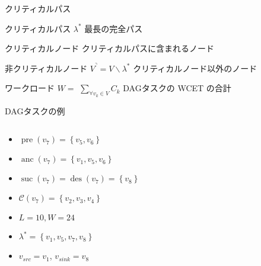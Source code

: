 \begin{frame}{クリティカルパス}
    \begin{block}{クリティカルパス $\lambda^{*}$}
        最長の完全パス
    \end{block}
    \begin{block}{クリティカルノード}
        クリティカルパスに含まれるノード
    \end{block}
    \begin{block}{非クリティカルノード $V^{\urcorner}=V \backslash \lambda^{*}$}
        クリティカルノード以外のノード
    \end{block}
    \begin{block}{ワークロード $W=$  $\sum_{\forall v_{k} \in V} C_{k}$}
        DAGタスクの WCET の合計
    \end{block}
\end{frame}


\begin{frame}{DAGタスクの例}
    \begin{columns}
        \begin{column}{0.4\textwidth}
            \begin{itemize}
                \item $\operatorname{pre}\left(v_{7}\right)=\left\{v_{5}, v_{6}\right\}$
                \item $\operatorname{anc}\left(v_{7}\right)=\left\{v_{1}, v_{5}, v_{6}\right\}$
                \item $\operatorname{suc}\left(v_{7}\right)=\operatorname{des}\left(v_{7}\right)=\left\{v_{8}\right\}$
                \item $\mathcal{C}\left(v_{7}\right)=\left\{v_{2}, v_{3}, v_{4}\right\}$
                \item $L=10, W=24$
                \item $\lambda^{*}=\left\{v_{1}, v_{5}, v_{7}, v_{8}\right\}$
                \item $v_{s r c}=v_{1}$, $v_{s i n k}=v_{8}$
            \end{itemize}
        \end{column}
        \begin{column}{0.6\textwidth}
        \end{column}
    \end{columns}
\end{frame}


